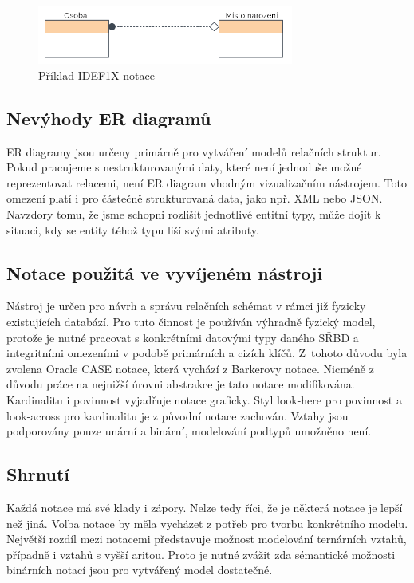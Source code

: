\documentclass[czech,bachelor,public,dept460,male,oneside]{diploma}
\begin{document}
		\begin{figure}[!h]
			\centering
			\includegraphics[width=0.75\textwidth]{Figures/NotationExIDEF1X}
			\caption[Příklad IDEF1X notace]{Příklad IDEF1X notace \cite{whatIsERD}}
			\label{fig:notationExIDEF1X}
		\end{figure}
	
	\subsection{Nevýhody ER diagramů}
	ER diagramy jsou určeny primárně pro vytváření modelů relačních struktur. Pokud pracujeme s nestrukturovanými daty, které není jednoduše možné reprezentovat relacemi, není ER diagram vhodným vizualizačním nástrojem. Toto omezení platí i pro částečně strukturovaná data, jako npř. XML nebo JSON. Navzdory tomu, že jsme schopni rozlišit jednotlivé entitní typy, může dojít k situaci, kdy se entity téhož typu liší svými atributy. 
	
	\subsection{Notace použitá ve vyvíjeném nástroji}
	Nástroj je určen pro návrh a správu relačních schémat v rámci již fyzicky existujících databází. Pro tuto činnost je používán výhradně fyzický model, protože je nutné pracovat s konkrétními datovými typy daného SŘBD a integritními omezeními v podobě primárních a cizích klíčů. Z~tohoto důvodu byla zvolena Oracle CASE notace, která vychází z Barkerovy notace. Nicméně z důvodu práce na nejnižší úrovni abstrakce je tato notace modifikována. Kardinalitu i povinnost vyjadřuje notace graficky. Styl look-here pro povinnost a look-across pro kardinalitu je z původní notace zachován. Vztahy jsou podporovány pouze unární a binární, modelování podtypů umožněno není.
	
	\subsection{Shrnutí}
	Každá notace má své klady i zápory. Nelze tedy říci, že je některá notace je lepší než jiná. Volba notace by měla vycházet z potřeb pro tvorbu konkrétního modelu. Největší rozdíl mezi notacemi představuje možnost modelování ternárních vztahů, případně i vztahů s vyšší aritou. Proto je nutné zvážit zda sémantické možnosti binárních notací jsou pro vytvářený model dostatečné. 
	
\end{document}
